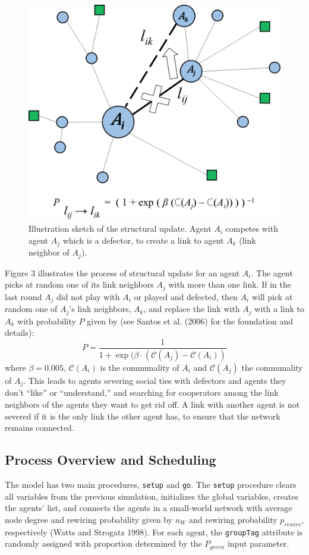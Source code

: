 \begin{figure}[t!]
	\label{fig:StructuralUpdate}
	\centering\includegraphics[width=0.75\linewidth]{figures/StructuralUpdate}
	\caption{Illustration sketch of the structural update. Agent $ A_i $ competes with agent $ A_j $ which is a defector, to create a link to agent $ A_k $ (link neighbor of $ A_j $).}
\end{figure}
Figure 3 illustrates the process of structural update for an agent $ A_i $. The agent picks at random one of its link neighbors $ A_j $ with more than one link. If in the last round $ A_j $ did not play with $ A_i $ or played and defected, then $ A_i $ will pick at random one of $ A_j $'s link neighbors, $ A_k $, and replace the link with $ A_j $ with a link to $ A_k $ with probability $ P $ given by (see Santos et al. (2006) for the foundation and details):
\begin{equation}
\label{eq:9}
P = \frac{1}{1 + \exp (\beta \cdot (\mathcal{C}(A_j) - \mathcal{C}(A_i))}
\end{equation}
where $ \beta = 0.005 $, $ \mathcal{C}(A_i) $ is the communality of $ A_i $ and $ \mathcal{C}(A_j) $ the communality of $ A_j $. This leads to agents severing social ties with defectors and agents they don't ``like'' or ``understand,'' and searching for cooperators among the link neighbors of the agents they want to get rid off. A link with another agent is not severed if it is the only link the other agent has, to ensure that the network remains connected. 


\subsection{Process Overview and Scheduling}
The model has two main procedures, \texttt{setup} and \texttt{go}. The \texttt{setup} procedure clears all variables from the previous simulation, initializes the global variables, creates the agents' list, and connects the agents in a small-world network with average node degree and rewiring probability given by $ n_{W} $ and rewiring probability $ p_{rewire} $, respectively (Watts and Strogatz 1998). For each agent, the \texttt{groupTag} attribute is randomly assigned with proportion determined by the $ P_{green} $ input parameter.

